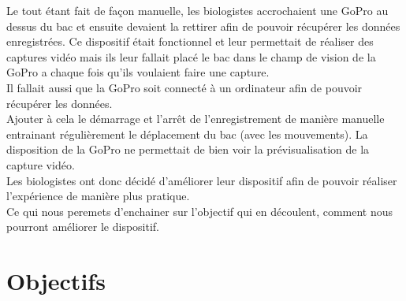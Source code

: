     \begin{flushleft}
        Le tout étant fait de façon manuelle, les biologistes accrochaient une GoPro au dessus du bac et ensuite devaient la rettirer afin de pouvoir récupérer les données enregistrées. Ce dispositif était fonctionnel et leur permettait de réaliser des captures vidéo mais ils leur fallait placé le bac dans le champ de vision de la GoPro a chaque fois qu'ils voulaient faire une capture.\\[0.2cm]
        
        Il fallait aussi que la GoPro soit connecté à un ordinateur afin de pouvoir récupérer les données.\\[0.2cm]

        Ajouter à cela le démarrage et l'arrêt de l'enregistrement de manière manuelle entrainant régulièrement le déplacement du bac (avec les mouvements). La disposition de la GoPro ne permettait de bien voir la prévisualisation de la capture vidéo.\\[0.2cm]

        Les biologistes ont donc décidé d'améliorer leur dispositif afin de pouvoir réaliser l'expérience de manière plus pratique.\\[0.2cm]

        Ce qui nous peremets d'enchainer sur l'objectif qui en découlent, comment nous pourront améliorer le dispositif.

    \end{flushleft}

    \vspace{0.1cm}


    \section{Objectifs}
    
